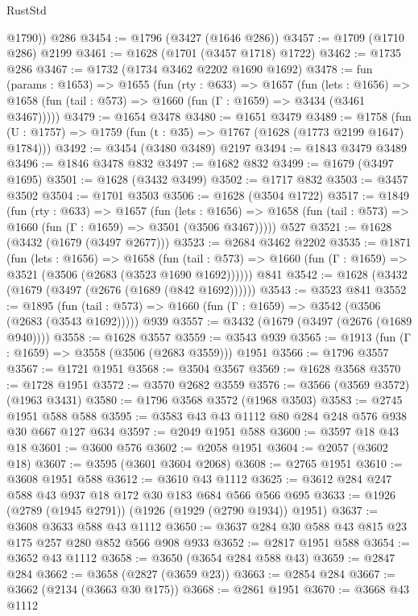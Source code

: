 \begin{lexlean}{RustStd}
\begin{coremodule}
        @1790))
    @286
@3454 := @1796 (@3427 (@1646 @286))
@3457 := @1709 (@1710 @286) @2199
@3461 := @1628 (@1701 (@3457 @1718) @1722)
@3462 := @1735 @286
@3467 := @1732 (@1734 @3462 @2202 @1690 @1692)
@3478 := fun (params : @1653) =>
  @1655
    (fun (rty : @633) =>
    @1657
      (fun (lets : @1656) =>
      @1658 (fun (tail : @573) => @1660 (fun (Γ : @1659) => @3434 (@3461 @3467)))))
@3479 := @1654 @3478
@3480 := @1651 @3479
@3489 := @1758 (fun (U : @1757) => @1759 (fun (t : @35) => @1767 (@1628 (@1773 @2199 @1647) @1784)))
@3492 := @3454 (@3480 @3489) @2197
@3494 := @1843 @3479 @3489
@3496 := @1846 @3478 @832
@3497 := @1682 @832
@3499 := @1679 (@3497 @1695)
@3501 := @1628 (@3432 @3499)
@3502 := @1717 @832
@3503 := @3457 @3502
@3504 := @1701 @3503
@3506 := @1628 (@3504 @1722)
@3517 := @1849
    (fun (rty : @633) =>
    @1657
      (fun (lets : @1656) =>
      @1658 (fun (tail : @573) => @1660 (fun (Γ : @1659) => @3501 (@3506 @3467)))))
    @527
@3521 := @1628 (@3432 (@1679 (@3497 @2677)))
@3523 := @2684 @3462 @2202
@3535 := @1871
    (fun (lets : @1656) =>
    @1658
      (fun (tail : @573) => @1660 (fun (Γ : @1659) => @3521 (@3506 (@2683 (@3523 @1690 @1692))))))
    @841
@3542 := @1628 (@3432 (@1679 (@3497 (@2676 (@1689 (@842 @1692))))))
@3543 := @3523 @841
@3552 := @1895
    (fun (tail : @573) => @1660 (fun (Γ : @1659) => @3542 (@3506 (@2683 (@3543 @1692)))))
    @939
@3557 := @3432 (@1679 (@3497 (@2676 (@1689 @940))))
@3558 := @1628 @3557
@3559 := @3543 @939
@3565 := @1913 (fun (Γ : @1659) => @3558 (@3506 (@2683 @3559))) @1951
@3566 := @1796 @3557
@3567 := @1721 @1951
@3568 := @3504 @3567
@3569 := @1628 @3568
@3570 := @1728 @1951
@3572 := @3570 @2682 @3559
@3576 := @3566 (@3569 @3572) (@1963 @3431)
@3580 := @1796 @3568 @3572 (@1968 @3503)
@3583 := @2745 @1951 @588 @588
@3595 := @3583 @43 @43 @1112 @80 @284 @248 @576 @938 @30 @667 @127 @634
@3597 := @2049 @1951 @588
@3600 := @3597 @18 @43 @18
@3601 := @3600 @576
@3602 := @2058 @1951
@3604 := @2057 (@3602 @18)
@3607 := @3595 (@3601 @3604 @2068)
@3608 := @2765 @1951
@3610 := @3608 @1951 @588
@3612 := @3610 @43 @1112
@3625 := @3612 @284 @247 @588 @43 @937 @18 @172 @30 @183 @684 @566 @566 @695
@3633 := @1926 (@2789 (@1945 @2791)) (@1926 (@1929 (@2790 @1934)) @1951)
@3637 := @3608 @3633 @588 @43 @1112
@3650 := @3637 @284 @30 @588 @43 @815 @23 @175 @257 @280 @852 @566 @908 @933
@3652 := @2817 @1951 @588
@3654 := @3652 @43 @1112
@3658 := @3650 (@3654 @284 @588 @43)
@3659 := @2847 @284
@3662 := @3658 (@2827 (@3659 @23))
@3663 := @2854 @284
@3667 := @3662 (@2134 (@3663 @30 @175))
@3668 := @2861 @1951
@3670 := @3668 @43 @1112

\end{coremodule}
\end{lexlean}
